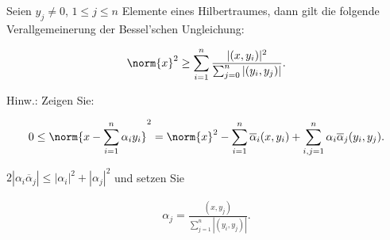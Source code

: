 
\begin{exercise}

Seien $y_j \neq 0$, $1 \leq j \leq n$ Elemente eines Hilbertraumes, dann gilt die folgende Verallgemeinerung der Bessel'schen Ungleichung:

\begin{align*}
    \norm{x}^2
    \geq
    \sum_{i=1}^n
    \frac
    {
        |(x, y_i)|^2
    }{
        \sum_{j=0}^n
        |(y_i, y_j)|
    }.
\end{align*}

Hinw.:
Zeigen Sie:

\begin{align*}
    0
    \leq
    \norm
    {
        x
        -
        \sum_{i=1}^n
        \alpha_i y_i
    }^2
    =
    \norm{x}^2
    -
    \sum_{i=1}^n
    \overline \alpha_i (x, y_i)
    +
    \sum_{i,j=1}^n
    \alpha_i \overline \alpha_j (y_i, y_j).
\end{align*}

$2 |\alpha_i \overline \alpha_j| \leq |\alpha_i|^2 + |\alpha_j|^2$ und setzen Sie

\begin{align*}
    \alpha_j
    =
    \frac
    {
        (x, y_j)
    }{
        \sum_{j=1}^n
        |(y_i, y_j)|
    }.
\end{align*}

\end{exercise}


